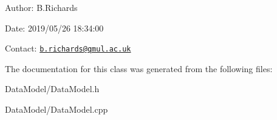 \begin{DoxyParagraph}{Author\-:}
B.\-Richards 
\end{DoxyParagraph}


\begin{DoxyParagraph}{Date\-:}
2019/05/26 18\-:34\-:00 
\end{DoxyParagraph}


Contact\-: \href{mailto:b.richards@qmul.ac.uk}{\tt b.\-richards@qmul.\-ac.\-uk} 

The documentation for this class was generated from the following files\-:\begin{DoxyCompactItemize}
\item 
Data\-Model/Data\-Model.\-h\item 
Data\-Model/Data\-Model.\-cpp\end{DoxyCompactItemize}
